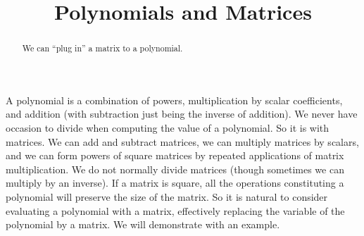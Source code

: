 \documentclass{ximera}
\title{Polynomials and Matrices}
\begin{document}
\begin{abstract}
  We can ``plug in'' a matrix to a polynomial.
\end{abstract}
\maketitle


A polynomial is a combination of powers, multiplication by scalar
coefficients, and addition (with subtraction just being the inverse of
addition).  We never have occasion to divide when computing the value
of a polynomial.  So it is with matrices.  We can add and subtract
matrices, we can multiply matrices by scalars, and we can form powers
of square matrices by repeated applications of matrix multiplication.
We do not normally divide matrices (though sometimes we can multiply
by an inverse).  If a matrix is square, all the operations
constituting a polynomial will preserve the size of the matrix.  So it
is natural to consider evaluating a polynomial with a matrix,
effectively replacing the variable of the polynomial by a matrix.  We
will demonstrate with an example.
\end{document}

